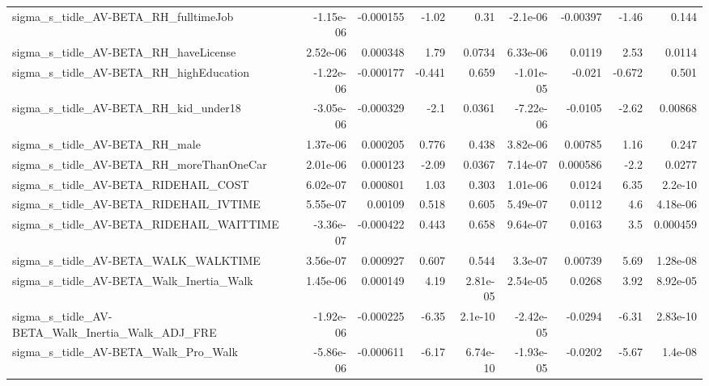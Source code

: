 \begin{tabular}{lrrrrrrrr}
sigma\_s\_tidle\_AV-BETA\_RH\_fulltimeJob               &   -1.15e-06 &    -0.000155 &    -1.02 &     0.31 &   -2.1e-06 &    -0.00397 &        -1.46 &         0.144 \\
sigma\_s\_tidle\_AV-BETA\_RH\_haveLicense               &    2.52e-06 &     0.000348 &     1.79 &   0.0734 &   6.33e-06 &      0.0119 &         2.53 &        0.0114 \\
sigma\_s\_tidle\_AV-BETA\_RH\_highEducation             &   -1.22e-06 &    -0.000177 &   -0.441 &    0.659 &  -1.01e-05 &      -0.021 &       -0.672 &         0.501 \\
sigma\_s\_tidle\_AV-BETA\_RH\_kid\_under18               &   -3.05e-06 &    -0.000329 &     -2.1 &   0.0361 &  -7.22e-06 &     -0.0105 &        -2.62 &       0.00868 \\
sigma\_s\_tidle\_AV-BETA\_RH\_male                      &    1.37e-06 &     0.000205 &    0.776 &    0.438 &   3.82e-06 &     0.00785 &         1.16 &         0.247 \\
sigma\_s\_tidle\_AV-BETA\_RH\_moreThanOneCar            &    2.01e-06 &     0.000123 &    -2.09 &   0.0367 &   7.14e-07 &    0.000586 &         -2.2 &        0.0277 \\
sigma\_s\_tidle\_AV-BETA\_RIDEHAIL\_COST                &    6.02e-07 &     0.000801 &     1.03 &    0.303 &   1.01e-06 &      0.0124 &         6.35 &       2.2e-10 \\
sigma\_s\_tidle\_AV-BETA\_RIDEHAIL\_IVTIME              &    5.55e-07 &      0.00109 &    0.518 &    0.605 &   5.49e-07 &      0.0112 &          4.6 &      4.18e-06 \\
sigma\_s\_tidle\_AV-BETA\_RIDEHAIL\_WAITTIME            &   -3.36e-07 &    -0.000422 &    0.443 &    0.658 &   9.64e-07 &      0.0163 &          3.5 &      0.000459 \\
sigma\_s\_tidle\_AV-BETA\_WALK\_WALKTIME                &    3.56e-07 &     0.000927 &    0.607 &    0.544 &    3.3e-07 &     0.00739 &         5.69 &      1.28e-08 \\
sigma\_s\_tidle\_AV-BETA\_Walk\_Inertia\_Walk            &    1.45e-06 &     0.000149 &     4.19 & 2.81e-05 &   2.54e-05 &      0.0268 &         3.92 &      8.92e-05 \\
sigma\_s\_tidle\_AV-BETA\_Walk\_Inertia\_Walk\_ADJ\_FRE    &   -1.92e-06 &    -0.000225 &    -6.35 &  2.1e-10 &  -2.42e-05 &     -0.0294 &        -6.31 &      2.83e-10 \\
sigma\_s\_tidle\_AV-BETA\_Walk\_Pro\_Walk                &   -5.86e-06 &    -0.000611 &    -6.17 & 6.74e-10 &  -1.93e-05 &     -0.0202 &        -5.67 &       1.4e-08 \\

\end{tabular}
